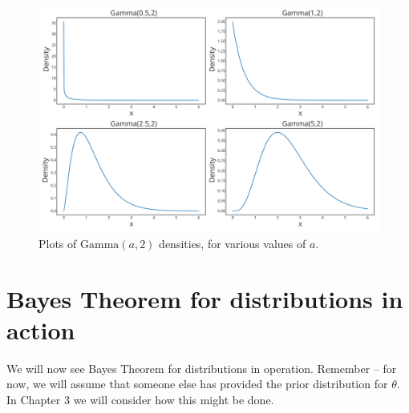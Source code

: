 \begin{figure}[!h]
\centering
\includegraphics{images/gammaplot1.svg}
\caption{Plots of $\text{Gamma}(a,2)$ densities, for various values of $a$.}
\end{figure}

\clearpage

\section{Bayes Theorem for distributions in action}
\noindent We will now see Bayes Theorem for distributions in operation.  Remember -- for now, we will assume that someone else has provided the prior distribution for $\theta$. In Chapter 3 we will consider how this might be done.  

